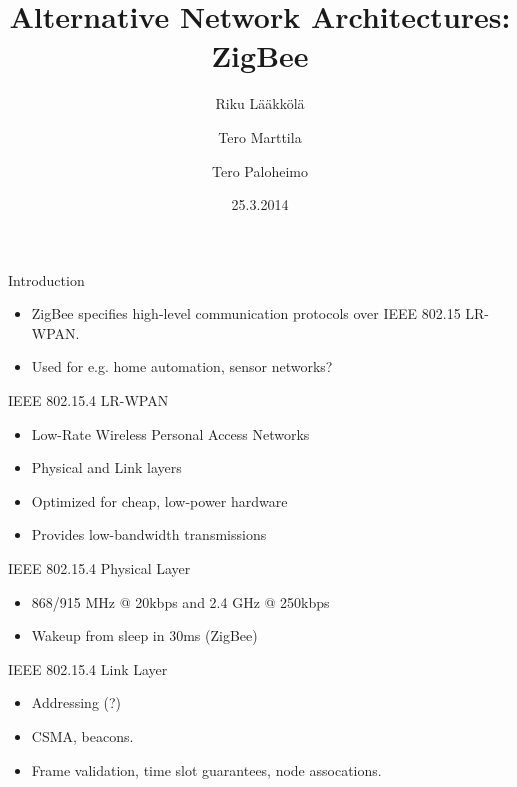 \documentclass{beamer}
\title[ZigBee]{Alternative Network Architectures: ZigBee}
\author{Riku Lääkkölä \and Tero Marttila \and Tero Paloheimo}
\institute{Aalto ELEC}
\date{25.3.2014}
\begin{document}
\begin{frame}
  	\titlepage
\end{frame}


\begin{frame}{Introduction}
  \begin{itemize}
    \item ZigBee specifies high-level communication protocols over IEEE 802.15 LR-WPAN.
    \item Used for e.g. home automation, sensor networks?
  \end{itemize}
\end{frame}

\begin{frame}{IEEE 802.15.4 LR-WPAN}
  \begin{itemize}
  	\item Low-Rate Wireless Personal Access Networks
	\item Physical and Link layers
  	\item Optimized for cheap, low-power hardware
  	\item Provides low-bandwidth transmissions
  	
  \end{itemize}
\end{frame}

\begin{frame}{IEEE 802.15.4 Physical Layer}
  \begin{itemize}
  	\item 868/915 MHz @ 20kbps and 2.4 GHz @ 250kbps
    \item Wakeup from sleep in 30ms (ZigBee)
  \end{itemize}
\end{frame}
    
\begin{frame}{IEEE 802.15.4 Link Layer}
  \begin{itemize}
  	\item Addressing (?)
  	\item CSMA, beacons.
  	\item Frame validation, time slot guarantees, node assocations.
  \end{itemize}
\end{frame}
\end{document}
